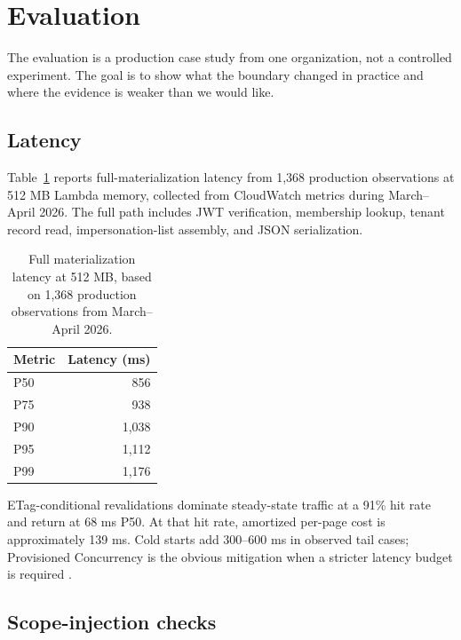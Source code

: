 \section{Evaluation}
\label{sec:evaluation}

The evaluation is a production case study from one organization, not a controlled experiment. The goal is to show what the boundary changed in practice and where the evidence is weaker than we would like.

\subsection{Latency}

Table~\ref{tab:latency} reports  full-materialization latency from 1,368 production observations at 512 MB Lambda memory, collected from CloudWatch metrics during March--April 2026. The full path includes JWT verification, membership lookup, tenant record read, impersonation-list assembly, and JSON serialization.

\begin{table}[H]
  \centering
  \small
  \begin{tabularx}{0.65\textwidth}{X r}
    \toprule
    \textbf{Metric} & \textbf{Latency (ms)} \\
    \midrule
    P50 & 856 \\
    P75 & 938 \\
    P90 & 1,038 \\
    P95 & 1,112 \\
    P99 & 1,176 \\
    \bottomrule
  \end{tabularx}
  \caption{Full  materialization latency at 512 MB, based on 1,368 production observations from March--April 2026.}
  \label{tab:latency}
\end{table}

ETag-conditional revalidations dominate steady-state traffic at a 91\% hit rate and return  at 68 ms P50. At that hit rate, amortized per-page cost is approximately 139 ms. Cold starts add 300--600 ms in observed tail cases; Provisioned Concurrency is the obvious mitigation when a stricter latency budget is required \cite{aws_lambda_docs}.

\subsection{Scope-injection checks}

